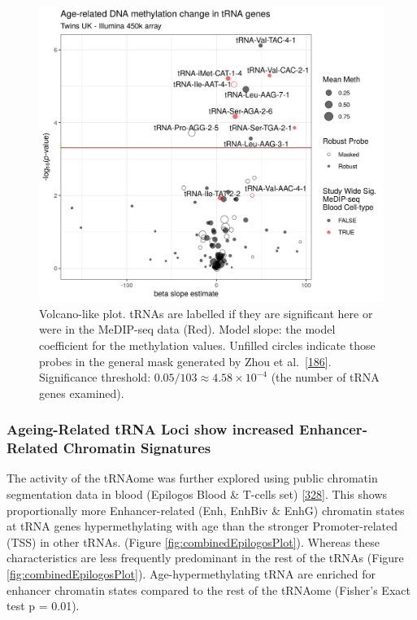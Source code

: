 \documentclass[
]{book}
\begin{document}
\begin{figure}

{\centering \includegraphics[width=1\linewidth]{./figs/blood_epitwins450k_Counts_sws_bl_zhou} 

}

\caption{Volcano-like plot. tRNAs are labelled if they are significant here or were in the MeDIP-seq data (Red). Model slope: the model coefficient for the methylation values. Unfilled circles indicate those probes in the general mask generated by Zhou et al.~{[}\protect\hyperlink{ref-Zhou2017}{186}{]}. Significance threshold: \(0.05/103 \approx 4.58\times10^{-4}\) (the number of tRNA genes examined).}\label{fig:bloodEpitwins450kCounts}
\end{figure}



\hypertarget{ageing-related-trna-loci-show-increased-enhancer-related-chromatin-signatures}{%
\subsubsection{Ageing-Related tRNA Loci show increased Enhancer-Related Chromatin Signatures}\label{ageing-related-trna-loci-show-increased-enhancer-related-chromatin-signatures}}

The activity of the tRNAome was further explored using public chromatin segmentation data in blood (Epilogos Blood \& T-cells set) {[}\protect\hyperlink{ref-Meuleman2019}{328}{]}.
This shows proportionally more Enhancer-related (Enh, EnhBiv \& EnhG) chromatin states at tRNA genes hypermethylating with age than the stronger Promoter-related (TSS) in other tRNAs. (Figure \ref{fig:combinedEpilogosPlot}).
Whereas these characteristics are less frequently predominant in the rest of the tRNAs (Figure \ref{fig:combinedEpilogosPlot}).
Age-hypermethylating tRNA are enriched for enhancer chromatin states compared to the rest of the tRNAome (Fisher's Exact test p = 0.01).
\end{document}

